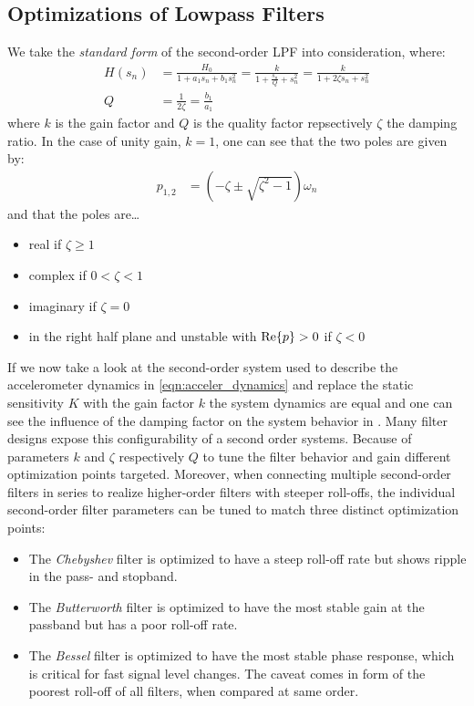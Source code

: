 \subsection{Optimizations of Lowpass Filters}
We take the \emph{standard form} of the second-order \ac{LPF} into consideration, where:
\begin{align}
  H(s_n) &= \frac{H_0}{1+a_1s_n+b_1s_n^2} = \frac{k}{\displaystyle 1+\frac{s_n}{Q}+s_n^2} = \frac{k}{1+2\zeta s_n+s_n^2} \\
  Q &= \frac{1}{2\zeta} = \frac{b_1}{a_1}
\end{align}
where $k$ is the gain factor and $Q$ is the quality factor repsectively $\zeta$ the damping ratio. In the case of unity gain, $k=1$, one can see that the two poles are given by:
\begin{align}
  p_{1,2} &= (-\zeta \pm \sqrt{\zeta^2-1})\omega_n
\end{align}
and that the poles are\dots
\begin{itemize}
  \item real if $\zeta\geq 1$
  \item complex if $0<\zeta<1$
  \item imaginary if $\zeta=0$
  \item in the right half plane and unstable with $\mathrm{Re}\Bqty{p}>0$ if $\zeta<0$
\end{itemize}
If we now take a look at the second-order system used to describe the accelerometer dynamics in \eqref{eqn:acceler_dynamics} and replace the static sensitivity $K$ with the gain factor $k$ the system dynamics are equal and one can see the influence of the damping factor on the system behavior in .
Many filter designs expose this configurability of a second order systems. Because of parameters $k$ and $\zeta$ respectively $Q$ to tune the filter behavior and gain different optimization points targeted. Moreover, when connecting multiple second-order filters in series to realize higher-order filters with steeper roll-offs, the individual second-order filter parameters can be tuned to match three distinct optimization points:

\begin{itemize}
  \item The \emph{Chebyshev} filter is optimized to have a steep roll-off rate but shows ripple in the pass- and stopband.
  \item The \emph{Butterworth} filter is optimized to have the most stable gain at the passband but has a poor roll-off rate.
  \item The \emph{Bessel} filter is optimized to have the most stable phase response, which is critical for fast signal level changes. The caveat comes in form of the poorest roll-off of all filters, when compared at same order.
\end{itemize}

